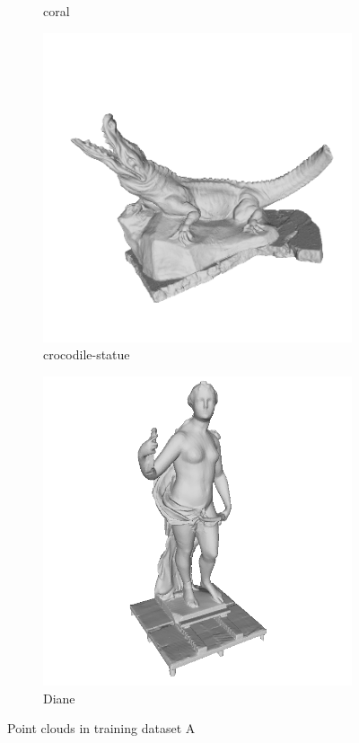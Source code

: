 \begin{figure}[H]
\begin{subfigure}[b]{0.23\linewidth}
		\caption{coral}
	\end{subfigure}
	\begin{subfigure}[b]{0.23\linewidth}
		\includegraphics[width=\linewidth]{./Figures/train-dataset/14.crocodile-statue.png}
		\caption{crocodile-statue}
	\end{subfigure}
	\begin{subfigure}[b]{0.23\linewidth}
		\includegraphics[width=\linewidth]{./Figures/train-dataset/15.diane.png}
		\caption{Diane}
	\end{subfigure}

	\label{fig:dataset_a}
\caption{Point clouds in training dataset A }
\end{figure}


